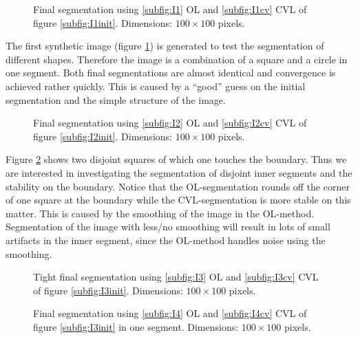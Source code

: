 \begin{figure}[h]
  \centering
  \caption{Final segmentation using \ref{subfig:I1} OL and \ref{subfig:I1cv} CVL of figure \ref{subfig:I1init}. Dimensions: $100\times 100$ pixels.}\label{I1}
\end{figure}

The first synthetic image (figure \ref{I1}) is generated to test the segmentation of different shapes. Therefore the image is a combination of a square and a circle in one segment. Both final segmentations are almost identical and convergence is achieved rather quickly. This is caused by a ``good'' guess on the initial segmentation and the simple structure of the image.\\

\begin{figure}[h]
  \centering
  \caption{Final segmentation using \ref{subfig:I2} OL and \ref{subfig:I2cv} CVL of figure \ref{subfig:I2init}. Dimensions: $100\times 100$ pixels.}\label{I2}
\end{figure}

Figure \ref{I2} shows two disjoint squares of which one touches the boundary. Thus we are interested in investigating the segmentation of disjoint inner segments and the stability on the boundary. Notice that the OL-segmentation rounds off the corner of one square at the boundary while the CVL-segmentation is more stable on this matter. This is caused by the smoothing of the image in the OL-method. Segmentation of the image with less/no smoothing will result in lots of small artifacts in the inner segment, since the OL-method handles noise using the smoothing.\\

\begin{figure}[h]
  \centering
  \caption{Tight final segmentation using \ref{subfig:I3} OL and \ref{subfig:I3cv} CVL of figure \ref{subfig:I3init}. Dimensions: $100\times 100$ pixels.}\label{I3}
\end{figure}
\begin{figure}[h]
  \centering
  \caption{Final segmentation using \ref{subfig:I4} OL and \ref{subfig:I4cv} CVL of figure \ref{subfig:I3init} in one segment. Dimensions: $100\times 100$ pixels.}\label{I4}
\end{figure}


